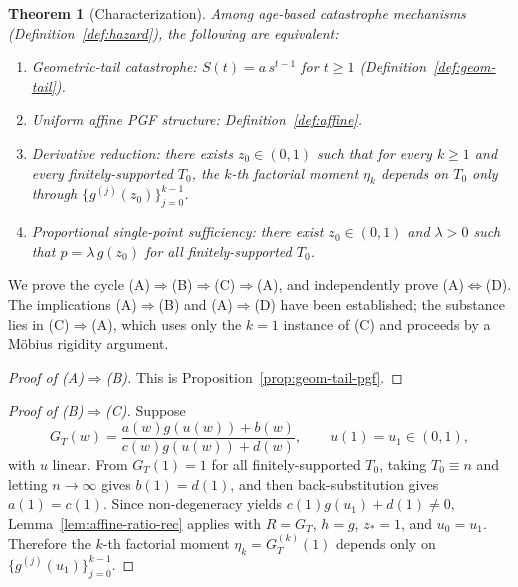 \documentclass[11pt]{article}
\theoremstyle{plain}
\newtheorem{theorem}{Theorem}[section]
\theoremstyle{definition}
\theoremstyle{remark}
\begin{document}
\begin{theorem}[Characterization]\label{thm:char}
Among age-based catastrophe mechanisms (Definition~\ref{def:hazard}), the following are equivalent:
\begin{enumerate}[\rm (A)]
  \item \emph{Geometric-tail catastrophe}: $S(t) = a\,s^{t-1}$ for $t \geq 1$ (Definition~\ref{def:geom-tail}).
  \item \emph{Uniform affine PGF structure}: Definition~\ref{def:affine}.
  \item \emph{Derivative reduction}: there exists $z_0 \in (0,1)$ such that for every $k \geq 1$ and every finitely-supported $T_0$, the $k$-th factorial moment $\eta_k$ depends on $T_0$ only through $\{g^{(j)}(z_0)\}_{j=0}^{k-1}$.
  \item \emph{Proportional single-point sufficiency}: there exist $z_0 \in (0,1)$ and $\lambda > 0$ such that $p = \lambda\,g(z_0)$ for all finitely-supported $T_0$.
\end{enumerate}
\end{theorem}

We prove the cycle (A)$\Rightarrow$(B)$\Rightarrow$(C)$\Rightarrow$(A), and independently prove (A)$\Leftrightarrow$(D).  The implications (A)$\Rightarrow$(B) and (A)$\Rightarrow$(D) have been established; the substance lies in (C)$\Rightarrow$(A), which uses only the $k = 1$ instance of (C) and proceeds by a M\"obius rigidity argument.

\begin{proof}[Proof of {\rm (A)$\Rightarrow$(B)}]
This is Proposition~\ref{prop:geom-tail-pgf}.
\end{proof}


\begin{proof}[Proof of {\rm (B)$\Rightarrow$(C)}]
Suppose
\[
  G_T(w)=\frac{a(w)g(u(w))+b(w)}{c(w)g(u(w))+d(w)},
  \qquad u(1)=u_1\in(0,1),
\]
with $u$ linear. From $G_T(1)=1$ for all finitely-supported $T_0$, taking $T_0\equiv n$ and letting $n\to\infty$ gives $b(1)=d(1)$, and then back-substitution gives $a(1)=c(1)$. Since non-degeneracy yields $c(1)g(u_1)+d(1)\neq 0$, Lemma~\ref{lem:affine-ratio-rec} applies with $R=G_T$, $h=g$, $z_*=1$, and $u_0=u_1$. Therefore the $k$-th factorial moment $\eta_k=G_T^{(k)}(1)$ depends only on $\{g^{(j)}(u_1)\}_{j=0}^{k-1}$.
\end{proof}
\end{document}
